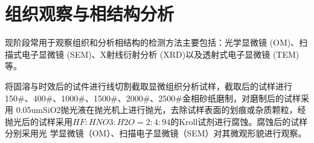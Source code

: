 \section{组织观察与相结构分析}
现阶段常用于观察组织和分析相结构的检测方法主要包括：光学显微镜 (OM)、扫描式电子显微镜 (SEM)、X射线衍射分析 (XRD)以及透射式电子显微镜 (TEM)等。

将固溶与时效后的试件进行线切割截取显微组织分析试样，截取后的试样进行 150\#、400\#、1000\#、1500\#、2000\#、2500\#金相砂纸磨制，对磨制后的试样采用 0.05umSiO2抛光液在抛光机上进行抛光，去除试样表面的划痕或杂质颗粒，经抛光后的试样采用$ HF:HNO3:H2O=2:4:94 $的Kroll试剂进行腐蚀。腐蚀后的试样分别采用光 学显微镜（OM）、扫描电子显微镜（SEM）对其微观形貌进行观察。
